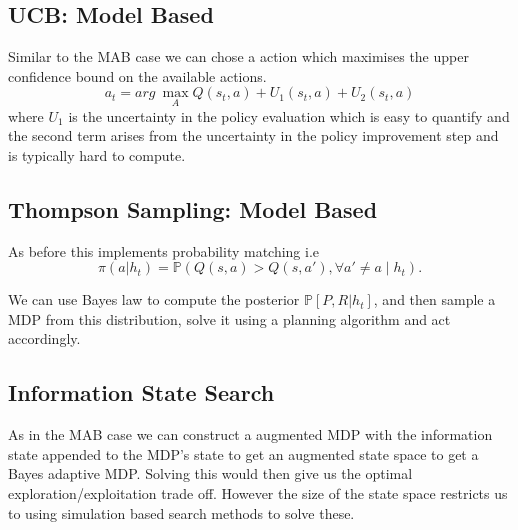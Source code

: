\documentclass{article}
\begin{document}
\subsection{UCB: Model Based}
Similar to the MAB case we can chose a action which maximises the upper confidence bound on the available actions. 
$$a_t=arg~\max_A Q(s_t,a)+U_1(s_t,a)+U_2(s_t,a)$$ 
where $U_1$ is the uncertainty in the policy evaluation which is easy to quantify and the second term arises from the uncertainty in the policy improvement step and is typically hard to compute.
\subsection{Thompson Sampling: Model Based}
As before this implements probability matching i.e
\begin{equation}
    \pi(a | h_t) = \mathbb{P}(Q(s,a) > Q(s,a') , \forall a' \neq a \mid h_t).
\end{equation}

We can use Bayes law to compute the posterior $\mathbb{P}[P,R|h_t]$, and then sample a MDP from this distribution, solve it using a planning algorithm and act accordingly.
\subsection{Information State Search}
As in the MAB case we can construct a augmented MDP with the information state appended to the MDP's state to get an augmented state space to get a Bayes adaptive MDP.
Solving this would then give us the optimal exploration/exploitation trade off. However the size of the state space restricts us to using simulation based search methods to solve these.
\end{document}
